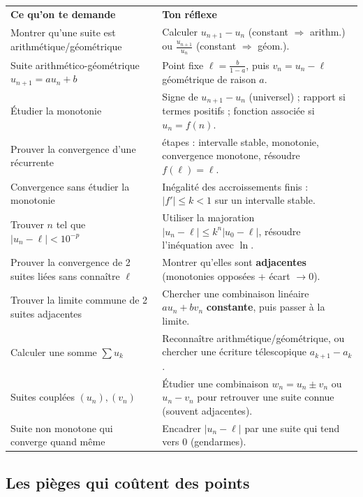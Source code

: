 \documentclass[11pt,a4paper]{article}
\begin{document}
\begin{center}
\renewcommand{\arraystretch}{1.45}
\sffamily\small
\begin{tabular}{>{\raggedright\arraybackslash}p{7.2cm} >{\raggedright\arraybackslash}p{8cm}}
\rowcolor{qtealdark} \color{white}\bfseries Ce qu'on te demande & \color{white}\bfseries Ton réflexe \\
\rowcolor{tealpale} Montrer qu'une suite est arithmétique/géométrique & Calculer $u_{n+1}-u_n$ (constant $\Rightarrow$ arithm.) ou $\frac{u_{n+1}}{u_n}$ (constant $\Rightarrow$ géom.). \\
Suite arithmético-géométrique $u_{n+1}=au_n+b$ & Point fixe $\ell=\frac{b}{1-a}$, puis $v_n=u_n-\ell$ géométrique de raison $a$. \\
\rowcolor{tealpale} Étudier la monotonie & Signe de $u_{n+1}-u_n$ (universel) ; rapport si termes positifs ; fonction associée si $u_n=f(n)$. \\
Prouver la convergence d'une récurrente & 4 étapes : intervalle stable, monotonie, convergence monotone, résoudre $f(\ell)=\ell$. \\
\rowcolor{tealpale} Convergence sans étudier la monotonie & Inégalité des accroissements finis : $|f'|\leq k<1$ sur un intervalle stable. \\
Trouver $n$ tel que $|u_n-\ell|<10^{-p}$ & Utiliser la majoration $|u_n-\ell|\leq k^n|u_0-\ell|$, résoudre l'inéquation avec $\ln$. \\
\rowcolor{tealpale} Prouver la convergence de 2 suites liées sans connaître $\ell$ & Montrer qu'elles sont \textbf{adjacentes} (monotonies opposées + écart $\to0$). \\
Trouver la limite commune de 2 suites adjacentes & Chercher une combinaison linéaire $au_n+bv_n$ \textbf{constante}, puis passer à la limite. \\
\rowcolor{tealpale} Calculer une somme $\sum u_k$ & Reconnaître arithmétique/géométrique, ou chercher une écriture télescopique $a_{k+1}-a_k$. \\
Suites couplées $(u_n),(v_n)$ & Étudier une combinaison $w_n = u_n \pm v_n$ ou $u_n - v_n$ pour retrouver une suite connue (souvent adjacentes). \\
\rowcolor{tealpale} Suite non monotone qui converge quand même & Encadrer $|u_n - \ell|$ par une suite qui tend vers $0$ (gendarmes). \\
\end{tabular}
\end{center}

\subsection{Les pièges qui coûtent des points}
\end{document}
